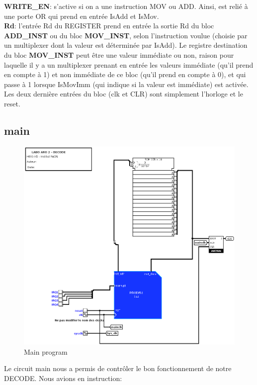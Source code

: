 \documentclass[a4paper]{article} %
\begin{document}
\textbf{WRITE\_EN}: s'active si on a une instruction MOV ou ADD. Ainsi, est relié à une porte OR qui prend en entrée IsAdd et IsMov.
\medskip \\
\textbf{Rd}: l'entrée Rd du REGISTER prend en entrée la sortie Rd du bloc \textbf{ADD\_INST} ou du bloc \textbf{MOV\_INST}, selon l'instruction voulue (choisie par un multiplexer dont la valeur est déterminée par IsAdd). Le registre destination du bloc \textbf{MOV\_INST} peut être une valeur immédiate ou non, raison pour laquelle il y a un multiplexer prenant en entrée les valeurs immédiate (qu'il prend en compte à 1) et non immédiate de ce bloc (qu'il prend en compte à 0), et qui passe à 1 lorsque IsMovImm (qui indique si la valeur est immédiate) est activée.
\medskip \\
Les deux dernière entrées du bloc (clk et CLR) sont simplement l'horloge et le reset.

\subsection{main}
\begin{figure}[H]
    \centering
    \includegraphics[width=1\textwidth]{src/main.png}
    \caption{Main program}
    \label{main_img}
\end{figure}

Le circuit main nous a permis de contrôler le bon fonctionnement de notre DECODE. Nous avions en instruction: \medskip
\end{document}
